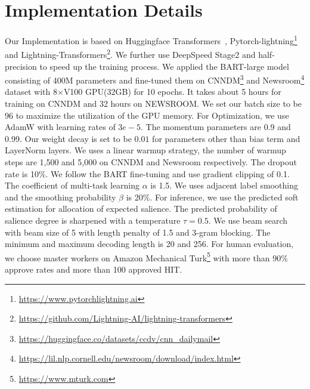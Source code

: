 \documentclass[11pt]{article}
\begin{document}
\section{Implementation Details}
\label{sec:appendix_implementation}
Our Implementation is based on Huggingface Transformers~\cite{wolf-etal-2020-transformers}, Pytorch-lightning\footnote{\url{https://www.pytorchlightning.ai}} and Lightning-Transformers\footnote{\url{https://github.com/Lightning-AI/lightning-transformers}}. We further use DeepSpeed \cite{rasley2020deepspeed} Stage2 and half-precision to speed up the training process.
We applied the BART-large model consisting of 400M parameters and fine-tuned them on CNNDM\footnote{\url{https://huggingface.co/datasets/ccdv/cnn_dailymail}} and Newsroom\footnote{\url{https://lil.nlp.cornell.edu/newsroom/download/index.html}} dataset with 8$\times$V100 GPU(32GB) for 10 epochs. It takes about 5 hours for training on CNNDM and 32 hours on NEWSROOM.
We set our batch size to be 96 to maximize the utilization of the GPU memory.
For Optimization, we use AdamW \cite{loshchilov2018decoupled} with learning rates of $3e-5$.
The momentum parameters are 0.9 and 0.99.
Our weight decay is set to be $0.01$ for parameters other than bias term and LayerNorm layers.
We uses a linear warmup strategy, the number of warmup steps are 1,500 and 5,000 on CNNDM and Newsroom respectively.
The dropout rate is 10\%.
We follow the BART \cite{lewis2020bart} fine-tuning and use gradient clipping of 0.1.
The coefficient of multi-task learning $\alpha$ is 1.5.
We uses adjacent label smoothing and the smoothing probability $\beta$ is 20\%.
For inference, we use the predicted soft estimation for allocation of expected salience.
The predicted probability of salience degree is sharpened with a temperature $\tau=0.5$.
We use beam search with beam size of 5 with length penalty of 1.5 and 3-gram blocking.
The minimum and maximum decoding length is 20 and 256.
For human evaluation, we choose master workers on Amazon Mechanical Turk\footnote{\url{https://www.mturk.com}} with
more than 90\% approve rates and more than 100 approved HIT.

 
\end{document}
